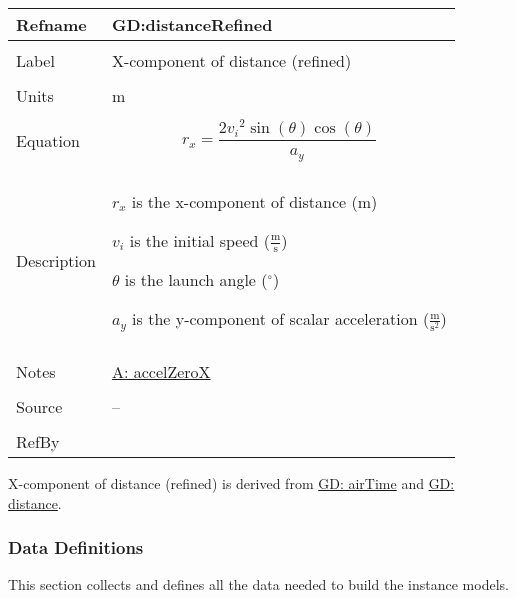 \documentclass[12pt]{article}
\begin{document}
\noindent \begin{minipage}{\textwidth}
\begin{tabular}{p{} p{}}
\toprule \textbf{Refname} & \textbf{GD:distanceRefined}
\label{GD:distanceRefined}
\\ \midrule \\
Label & X-component of distance (refined)
\\ \midrule \\
Units & m
\\ \midrule \\
Equation & \begin{displaymath}
           {r_{x}}=\frac{2 {v_{i}}^{2} \sin\left(θ\right) \cos\left(θ\right)}{{a_{y}}}
           \end{displaymath}
\\ \midrule \\
Description & \begin{symbDescription}
              \item{${r_{x}}$ is the x-component of distance (m)}
              \item{${v_{i}}$ is the initial speed ($\frac{\text{m}}{\text{s}}$)}
              \item{$θ$ is the launch angle (${}^{\circ}$)}
              \item{${a_{y}}$ is the y-component of scalar acceleration ($\frac{\text{m}}{\text{s}^{2}}$)}
              \end{symbDescription}
\\ \midrule \\
Notes & \hyperref[accelZeroX]{A: accelZeroX}
\\ \midrule \\
Source & --
\\ \midrule \\
RefBy & 
\\ \bottomrule \end{tabular}
\end{minipage}
X-component of distance (refined) is derived from \hyperref[GD:airTime]{GD: airTime} and \hyperref[GD:distance]{GD: distance}.
\subsubsection{Data Definitions}
\label{Sec:DDs}
This section collects and defines all the data needed to build the instance models.
\par~
\end{document}
